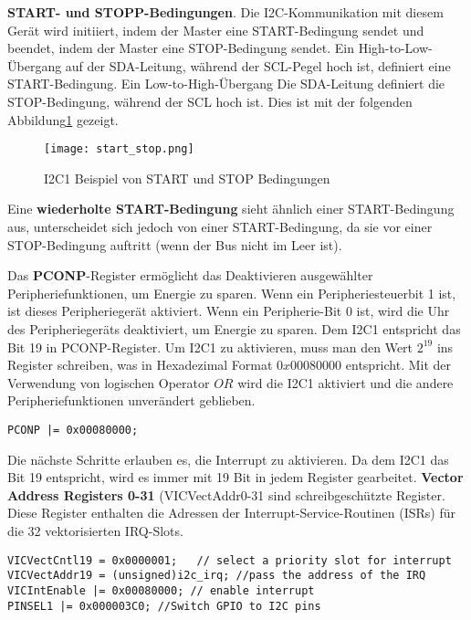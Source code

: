 \textbf{START- und STOPP-Bedingungen}. Die I2C-Kommunikation mit diesem Gerät wird initiiert, indem der Master eine START-Bedingung sendet und beendet, indem der Master eine STOP-Bedingung sendet. Ein High-to-Low-Übergang auf der SDA-Leitung, während der SCL-Pegel hoch ist, definiert eine START-Bedingung. Ein Low-to-High-Übergang Die SDA-Leitung definiert die STOP-Bedingung, während der SCL hoch ist. Dies ist mit der folgenden Abbildung\ref{fig:startstop} gezeigt. 

\begin{figure}[!hb]
	\centering
	\texttt{[image: start\_stop.png]}
	\caption[I2C Beispiel von START und STOP Bedingungen]{I2C1 Beispiel von START und STOP Bedingungen}
	\label{fig:startstop}
\end{figure}

Eine \textbf{wiederholte START-Bedingung} sieht ähnlich einer START-Bedingung aus, unterscheidet sich jedoch von einer START-Bedingung, da sie vor einer STOP-Bedingung auftritt (wenn der Bus nicht im Leer ist).

Das \textbf{PCONP}-Register ermöglicht das Deaktivieren ausgewählter Peripheriefunktionen, um Energie zu sparen. Wenn ein Peripheriesteuerbit 1 ist, ist dieses Peripheriegerät aktiviert. Wenn ein Peripherie-Bit 0 ist, wird die Uhr des Peripheriegeräts deaktiviert, um Energie zu sparen. Dem I2C1 entspricht das Bit 19 in PCONP-Register. Um I2C1 zu aktivieren, muss man den Wert $2^{19}$ ins Register schreiben, was in Hexadezimal Format $0x00080000$ entspricht. Mit der Verwendung von logischen Operator $OR$ wird die I2C1 aktiviert und die andere Peripheriefunktionen unverändert geblieben.
\begin{lstlisting}
PCONP |= 0x00080000;
\end{lstlisting}
Die nächste Schritte erlauben es, die Interrupt zu aktivieren. Da dem I2C1 das Bit 19 entspricht, wird es immer mit 19 Bit in jedem Register gearbeitet. \textbf{Vector Address Registers 0-31} (VICVectAddr0-31 sind schreibgeschützte Register. Diese Register enthalten die Adressen der Interrupt-Service-Routinen (ISRs) für die 32 vektorisierten IRQ-Slots.
\begin{lstlisting}
VICVectCntl19 = 0x0000001;   // select a priority slot for interrupt
VICVectAddr19 = (unsigned)i2c_irq; //pass the address of the IRQ
VICIntEnable |= 0x00080000; // enable interrupt
PINSEL1 |= 0x000003C0; //Switch GPIO to I2C pins
\end{lstlisting}

